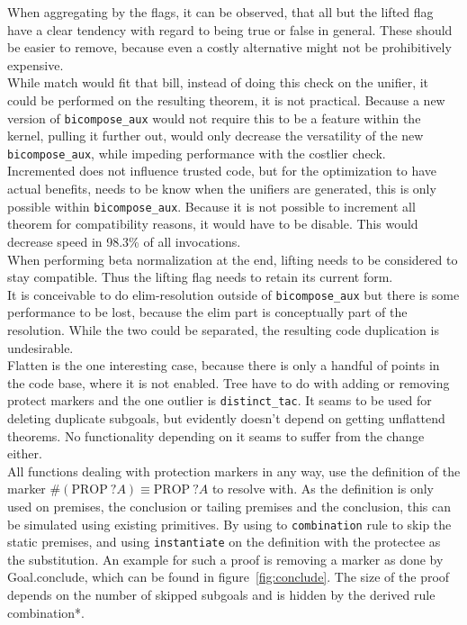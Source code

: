When aggregating by the flags, it can be observed, that all but the lifted flag have a clear tendency with regard to being true or false in general. These should be easier to remove, because even a costly alternative might not be prohibitively expensive.\\
While match would fit that bill, instead of doing this check on the unifier, it could be performed on the resulting theorem, it is not practical. Because a new version of \texttt{bicompose\_aux} would not require this to be a feature within the kernel, pulling it further out, would only decrease the versatility of the new \texttt{bicompose\_aux}, while impeding performance with the costlier check.\\
Incremented does not influence trusted code, but for the optimization to have actual benefits, needs to be know when the unifiers are generated, this is only possible within \texttt{bicompose\_aux}. Because it is not possible to increment all theorem for compatibility reasons, it would have to be disable. This would decrease speed in 98.3\% of all invocations.\\
When performing beta normalization at the end, lifting needs to be considered to stay compatible. Thus the lifting flag needs to retain its current form.\\
It is conceivable to do elim-resolution outside of \texttt{bicompose\_aux} but there is some performance to be lost, because the elim part is conceptually part of the resolution. While the two could be separated, the resulting code duplication is undesirable.\\
Flatten is the one interesting case, because there is only a handful of points in the code base, where it is not enabled. Tree have to do with adding or removing protect markers and the one outlier is \texttt{distinct\_tac}. It seams to be used for deleting duplicate subgoals, but evidently doesn't depend on getting unflattend theorems. No functionality depending on it seams to suffer from the change either.\\
All functions dealing with protection markers in any way, use the definition of the marker $\#(\text{PROP}~?A) \equiv \text{PROP}~?A$ to resolve with. As the definition is only used on premises, the conclusion or tailing premises and the conclusion, this can be simulated using existing primitives. By using to \texttt{combination} rule to skip the static premises, and using \texttt{instantiate} on the definition with the protectee as the substitution. An example for such a proof is removing a marker as done by Goal.conclude, which can be found in figure~\ref{fig:conclude}. The size of the proof depends on the number of skipped subgoals and is hidden by the derived rule combination*.

